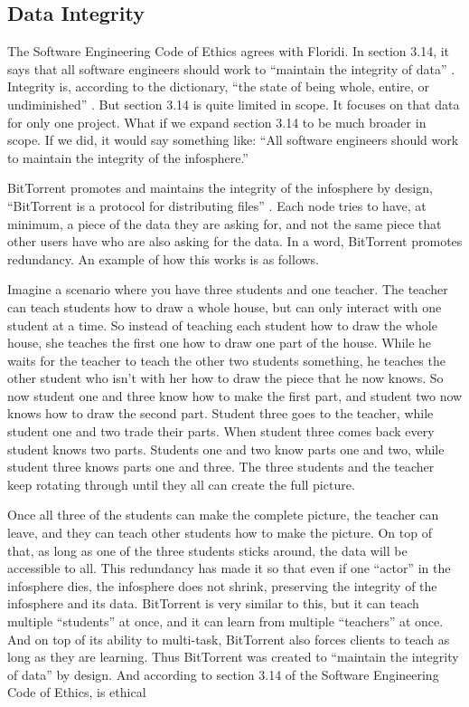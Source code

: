 \documentclass[11pt]{article}
\begin{document}
\begin{multicols}{2}
\subsection{Data Integrity}

The Software Engineering Code of Ethics agrees with Floridi. In section 3.14, it says that all software engineers should work to ``maintain the integrity of data'' \cite[3.14]{secode}. Integrity is, according to the dictionary, ``the state of being whole, entire, or undiminished'' \cite{integrity}. But section 3.14 is quite limited in scope. It focuses on that data for only one project. What if we expand section 3.14 to be much broader in scope. If we did, it would say something like: ``All software engineers should work to maintain the integrity of the infosphere.''

BitTorrent promotes and maintains the integrity of the infosphere by design, ``BitTorrent is a protocol for distributing files'' \cite{btspec}. Each node tries to have, at minimum, a piece of the data they are asking for, and not the same piece that other users have who are also asking for the data. In a word, BitTorrent promotes redundancy. An example of how this works is as follows.

Imagine a scenario where you have three students and one teacher. The teacher can teach students how to draw a whole house, but can only interact with one student at a time. So instead of teaching each student how to draw the whole house, she teaches the first one how to draw one part of the house. While he waits for the teacher to teach the other two students something, he teaches the other student who isn't with her how to draw the piece that he now knows. So now student one and three know how to make the first part, and student two now knows how to draw the second part. Student three goes to the teacher, while student one and two trade their parts. When student three comes back every student knows two parts. Students one and two know parts one and two, while student three knows parts one and three. The three students and the teacher keep rotating through until they all can create the full picture.

Once all three of the students can make the complete picture, the teacher can leave, and they can teach other students how to make the picture. On top of that, as long as one of the three students sticks around, the data will be accessible to all. This redundancy has made it so that even if one ``actor'' in the infosphere dies, the infosphere does not shrink, preserving the integrity of the infosphere and its data. BitTorrent is very similar to this, but it can teach multiple ``students'' at once, and it can learn from multiple ``teachers'' at once. And on top of its ability to multi-task, BitTorrent also forces clients to teach as long as they are learning. Thus BitTorrent was created to ``maintain the integrity of data'' by design. And according to section 3.14 of the Software Engineering Code of Ethics, is ethical


\end{multicols}
\end{document}
